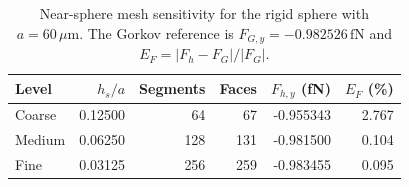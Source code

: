 \begin{table}[htbp]
    \centering
    \caption{Near-sphere mesh sensitivity for the rigid sphere with
    $a=60\,\mu\mathrm{m}$.  The Gorkov reference is
    $F_{G,y}=-0.982526\,\mathrm{fN}$ and
    $E_F=|F_h-F_G|/|F_G|$.}
    \label{tab:gorkovMeshConvergence}
    \small
    \begin{tabular}{lrrrrr}
        \toprule
        Level & $h_s/a$ & Segments & Faces & $F_{h,y}$ (fN) & $E_F$ (\%) \\
        \midrule
        Coarse & 0.12500 & 64  & 67  & -0.955343 & 2.767 \\
        Medium & 0.06250 & 128 & 131 & -0.981500 & 0.104 \\
        Fine   & 0.03125 & 256 & 259 & -0.983455 & 0.095 \\
        \bottomrule
    \end{tabular}
\end{table}

